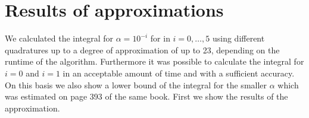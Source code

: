 \documentclass[letterpaper,10pt,english]{sphinxmanual}
\begin{document}
{
\begin{sphinxVerbatim}[commandchars=\\\{\}]
\llap{\color{nbsphinxin}[3]:\,\hspace{\fboxrule}\hspace{\fboxsep}}   
   
   
   
   
 
 

 
   
   

\end{sphinxVerbatim}
}


\section{Results of approximations}
\label{\detokenize{examples/Pertubated_Coulomb_Potential:Results-of-approximations}}
We calculated the integral for \(\alpha = 10^{-i}\) for in \(i = 0, \dots, 5\) using different quadratures up to a degree of approximation of up to 23, depending on the runtime of the algorithm. Furthermore it was possible to calculate the integral for \(i = 0\) and \(i=1\) in an acceptable amount of time and with a sufficient accuracy. On this basis we also show a lower bound of the integral for the smaller \(\alpha\) which was estimated on page 393 of the same book. First
we show the results of the approximation.
\end{document}
